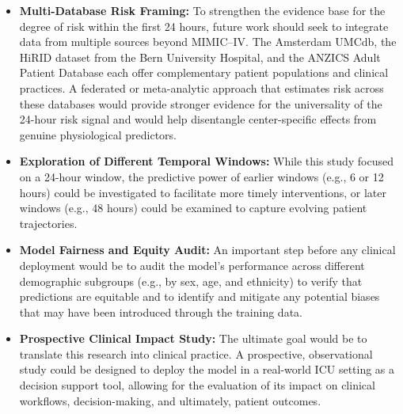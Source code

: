 \begin{itemize}
    \item \textbf{Multi-Database Risk Framing:} To strengthen the evidence base for the degree of risk within the first 24 hours, future work should seek to integrate data from multiple sources beyond MIMIC--IV. The Amsterdam UMCdb, the HiRID dataset from the Bern University Hospital, and the ANZICS Adult Patient Database each offer complementary patient populations and clinical practices. A federated or meta-analytic approach that estimates risk across these databases would provide stronger evidence for the universality of the 24-hour risk signal and would help disentangle center-specific effects from genuine physiological predictors.

    \item \textbf{Exploration of Different Temporal Windows:} While this study focused on a 24-hour window, the predictive power of earlier windows (e.g., 6 or 12 hours) could be investigated to facilitate more timely interventions, or later windows (e.g., 48 hours) could be examined to capture evolving patient trajectories.

    \item \textbf{Model Fairness and Equity Audit:} An important step before any clinical deployment would be to audit the model's performance across different demographic subgroups (e.g., by sex, age, and ethnicity) to verify that predictions are equitable and to identify and mitigate any potential biases that may have been introduced through the training data.

    \item \textbf{Prospective Clinical Impact Study:} The ultimate goal would be to translate this research into clinical practice. A prospective, observational study could be designed to deploy the model in a real-world ICU setting as a decision support tool, allowing for the evaluation of its impact on clinical workflows, decision-making, and ultimately, patient outcomes.
\end{itemize}
